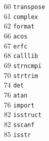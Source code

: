 \begin{footnotesize}
\begin{multicols}{3}
\vspace{-.153cm} 60    \hspace{.2cm} {\tt transpose           }    \\ %
\vspace{-.153cm} 61    \hspace{.2cm} {\tt complex             }    \\ %
\vspace{-.153cm} 62    \hspace{.2cm} {\tt format              }    \\ %
\vspace{-.153cm} 66    \hspace{.2cm} {\tt acos                }    \\ %
\vspace{-.153cm} 67    \hspace{.2cm} {\tt erfc                }    \\ %
\vspace{-.153cm} 68    \hspace{.2cm} {\tt calllib             }    \\ %
\vspace{-.153cm} 69    \hspace{.2cm} {\tt strncmpi            }    \\ %
\vspace{-.153cm} 70    \hspace{.2cm} {\tt strtrim             }    \\ %
\vspace{-.153cm} 74    \hspace{.2cm} {\tt det                 }    \\ %
\vspace{-.153cm} 76    \hspace{.2cm} {\tt atan                }    \\ %
\vspace{-.153cm} 76    \hspace{.2cm} {\tt import              }    \\ %
\vspace{-.153cm} 82    \hspace{.2cm} {\tt isstruct            }    \\ %
\vspace{-.153cm} 82    \hspace{.2cm} {\tt sscanf              }    \\ %
\vspace{-.153cm} 85    \hspace{.2cm} {\tt isstr               }    \\ %

\end{multicols}
\end{footnotesize}
